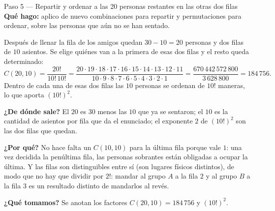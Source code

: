 \documentclass[11pt]{article}
\begin{document}
\begin{paso}{Paso 5 --- Repartir y ordenar a las 20 personas restantes en las otras dos filas}
\textbf{Qué hago:} aplico de nuevo combinaciones para repartir y permutaciones para ordenar, sobre las personas que aún no se han sentado.

Después de llenar la fila de los amigos quedan $30-10=20$ personas y dos filas de $10$ asientos. Se elige quiénes van a la primera de esas dos filas y el resto queda determinado:
\[
  C(20,10)=\frac{20!}{10!\,10!}
  =\frac{20\cdot 19\cdot 18\cdot 17\cdot 16\cdot 15\cdot 14\cdot 13\cdot 12\cdot 11}{10\cdot 9\cdot 8\cdot 7\cdot 6\cdot 5\cdot 4\cdot 3\cdot 2\cdot 1}
  =\frac{670\,442\,572\,800}{3\,628\,800}=184\,756 .
\]
Dentro de cada una de esas dos filas las $10$ personas se ordenan de $10!$ maneras, lo que aporta $(10!)^2$.

\textbf{¿De dónde sale?} El $20$ es $30$ menos las $10$ que ya se sentaron; el $10$ es la cantidad de asientos por fila que da el enunciado; el exponente $2$ de $(10!)^2$ son las dos filas que quedan.

\textbf{¿Por qué?} No hace falta un $C(10,10)$ para la última fila porque vale $1$: una vez decidida la penúltima fila, las personas sobrantes están obligadas a ocupar la última. Y las filas son distinguibles entre sí (son lugares físicos distintos), de modo que no hay que dividir por $2!$: mandar al grupo $A$ a la fila $2$ y al grupo $B$ a la fila $3$ es un resultado distinto de mandarlos al revés.

\textbf{¿Qué tomamos?} Se anotan los factores $C(20,10)=184\,756$ y $(10!)^2$.
\end{paso}
\end{document}
